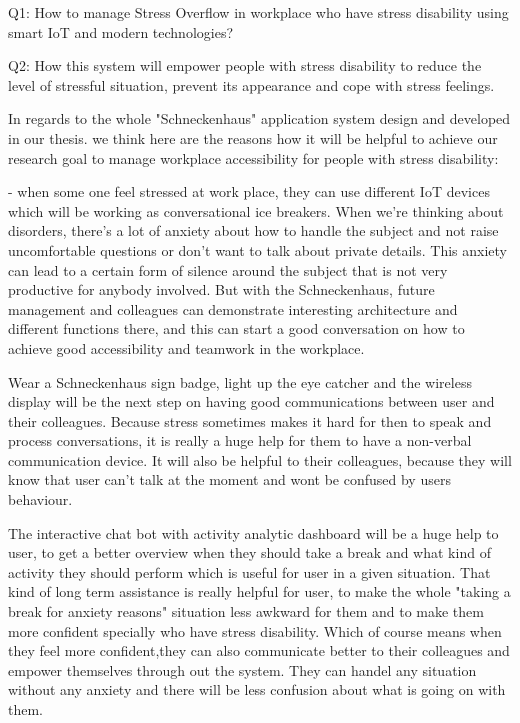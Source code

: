 Q1: How to manage Stress Overflow in workplace who have stress disability using smart \ac{IoT} and modern technologies?

Q2: How this system will empower people with stress disability to reduce the level of stressful situation, prevent its appearance and cope with stress feelings.

In regards to the whole "Schneckenhaus" application system design and developed in our thesis. we think here are the reasons how it will be helpful to achieve our research goal to manage workplace accessibility for people with stress disability:

- when some one feel stressed at work place, they can use different IoT devices which will be working as conversational ice breakers. When we're thinking about disorders, there's a lot of anxiety about how to handle the subject and not raise uncomfortable questions or don't want to talk about private details. This anxiety can lead to a certain form of silence around the subject that is not very productive for anybody involved. But with the Schneckenhaus, future management and colleagues can demonstrate interesting architecture and different functions there, and this can start a good conversation on how to achieve good accessibility and teamwork in the workplace.

Wear a Schneckenhaus sign badge, light up the eye catcher and the wireless display will be the next step on having good communications between user and their colleagues. Because stress sometimes makes it hard for then to speak and process conversations, it is really a huge help for them to have a non-verbal communication device. It will also be helpful to their colleagues, because they will know that user can't talk at the moment and wont be confused by users behaviour.

The interactive chat bot with activity analytic dashboard will be a huge help to user, to get a better overview when they should take a break and what kind of activity they should perform which is useful for user in a given situation. That kind of long term assistance is really helpful for user, to make the whole "taking a break for anxiety reasons" situation less awkward for them and to make them more confident specially who have stress  disability. Which of course means when they feel more confident,they can also communicate better to their colleagues and empower themselves through out the system. They can handel any situation without any anxiety and there will be less confusion about what is going on with them.

